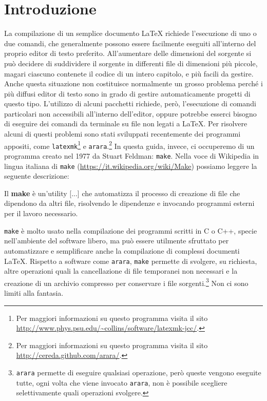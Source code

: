 \cleardoublepage{}
\chapter{Introduzione}
\label{cha:introduzione}

La compilazione di un semplice documento \LaTeX{}
richiede l'esecuzione di uno o due comandi, che generalmente possono essere
facilmente eseguiti all'interno del proprio editor di testo preferito.
All'aumentare delle dimensioni del sorgente si può decidere di suddividere il
sorgente in differenti file di dimensioni più piccole, magari ciascuno contenete
il codice di un intero capitolo, e più facili da gestire.  Anche questa
situazione non costituisce normalmente un grosso problema perché i più diffusi
editor di testo sono in grado di gestire automaticamente progetti di questo
tipo.  L'utilizzo di alcuni pacchetti richiede, però, l'esecuzione di comandi
particolari non accessibili all'interno dell'editor, oppure potrebbe esserci
bisogno di eseguire dei comandi da terminale su file non legati a \LaTeX{}.
Per risolvere alcuni di questi problemi sono stati sviluppati recentemente dei
programmi appositi, come
\texttt{latexmk}\footnote{Per maggiori informazioni su questo programma visita
  il sito \url{http://www.phys.psu.edu/~collins/software/latexmk-jcc/}.}
e
\texttt{arara}.\footnote{Per maggiori informazioni su questo programma visita il
  sito \url{http://cereda.github.com/arara/}.}
In questa guida, invece, ci occuperemo di un programma creato nel 1977 da Stuart
Feldman: \texttt{make}.  Nella voce di Wikipedia in lingua italiana di
\texttt{make} (\url{https://it.wikipedia.org/wiki/Make}) possiamo leggere la
seguente descrizione:
\begin{quoting}
  Il \textbf{make} è un'utility [...] che automatizza il processo di creazione
  di file che dipendono da altri file, risolvendo le dipendenze e invocando
  programmi esterni per il lavoro necessario.
\end{quoting}
\texttt{make} è molto usato nella compilazione dei programmi scritti in C o C++,
specie nell'ambiente del software libero, ma può essere utilmente sfruttato per
automatizzare e semplificare anche la compilazione di complessi documenti
\LaTeX{}.
Rispetto a software come \texttt{arara}, \texttt{make} permette di svolgere, su
richiesta, altre operazioni quali la cancellazione di file temporanei non
necessari e la creazione di un archivio compresso per conservare i file
sorgenti.\footnote{\texttt{arara} permette di eseguire qualsiasi operazione,
  però queste vengono eseguite tutte, ogni volta che viene invocato
  \texttt{arara}, non è possibile scegliere selettivamente quali operazioni
  svolgere.}  Non ci sono limiti alla fantasia.

